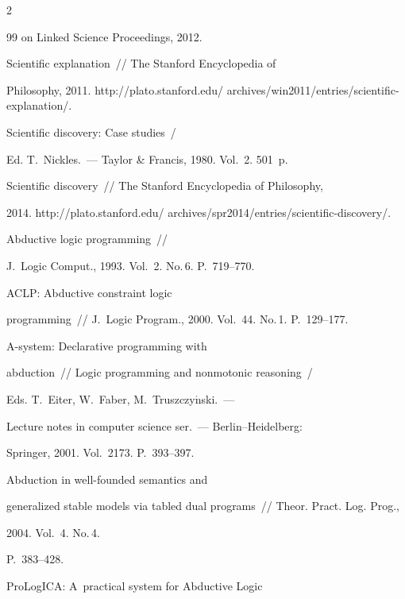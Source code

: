 \begin{multicols}{2}
{{\begin{thebibliography}{99}
on Linked Science Proceedings, 2012.




 Scientific explanation~// The Stanford Encyclopedia of


Philosophy, 2011. {\sf http://plato.stanford.edu/ archives/win2011/entries/scientific-explanation/}.




Scientific discovery: Case studies~/


Ed. T.~Nickles.~--- Taylor \& Francis, 1980. Vol.~2. 501~p.




 Scientific discovery~// The Stanford Encyclopedia of Philosophy,


2014. {\sf http://plato.stanford.edu/ archives/spr2014/entries/scientific-discovery/}.




 Abductive logic programming~//


J.~Logic Comput., 1993.  Vol.~2. No.\,6.  P.~719--770.




 ACLP: Abductive constraint logic


programming~// J.~Logic Program., 2000. Vol.~44. No.\,1. P.~129--177.




 A-system: Declarative programming with


abduction~// Logic programming and nonmotonic reasoning~/


Eds. T.~Eiter, W.~Faber, M.~Truszczy$\acute{\mbox{n}}$ski.~---


Lecture notes in computer science ser.~--- Berlin--Heidelberg:


Springer, 2001. Vol.~2173. P.~393--397.




 Abduction in well-founded semantics and


generalized stable models via tabled dual programs~// Theor. Pract. Log. Prog.,


2004. Vol.~4. No.\,4.


P.~383--428.




 ProLogICA: A~practical system for Abductive Logic



\end{thebibliography}}}
\end{multicols}

